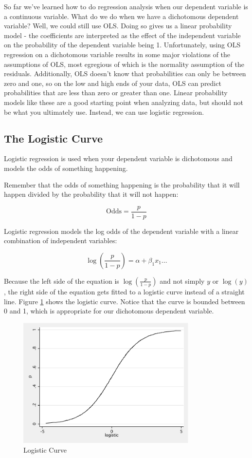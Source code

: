 \documentclass[12pt]{amsart}
\begin{document}
So far we've learned how to do regression analysis when our dependent variable is a continuous variable. What do we do when we have a dichotomous dependent variable? Well, we could still use OLS. Doing so gives us a linear probability model - the coefficients are interpreted as the effect of the independent variable on the probability of the dependent variable being 1. Unfortunately, using OLS regression on a dichotomous variable results in some major violations of the assumptions of OLS, most egregious of which is the normality assumption of the residuals. Additionally, OLS doesn't know that probabilities can only be between zero and one, so on the low and high ends of your data, OLS can predict probabilities that are less than zero or greater than one. Linear probability models like these are a good starting point when analyzing data, but should not be what you ultimately use. Instead, we can use logistic regression.

\subsection{The Logistic Curve}

Logistic regression is used when your dependent variable is dichotomous and models the odds of something happening. 

Remember that the odds of something happening is the probability that it will happen divided by the probability that it will not happen:

\[ \text{Odds} = \frac{p}{1-p} \]

Logistic regression models the log odds of the dependent variable with a linear combination of independent variables:

\[ \log \left( \frac{p}{1-p} \right) = \alpha + \beta_1 x_1 ...\]

Because the left side of the equation is $\log(\frac{p}{1-p})$ and not simply $y$ or $\log(y)$, the right side of the equation gets fitted to a logistic curve instead of  a straight line. Figure \ref{fig:one} shows the logistic curve. Notice that the curve is bounded between 0 and 1, which is appropriate for our dichotomous dependent variable.

\begin{figure}[htb]
\caption{Logistic Curve\label{fig:one}}
\includegraphics[width=0.8\textwidth]{logisticcurve}
\end{figure}
\end{document}
